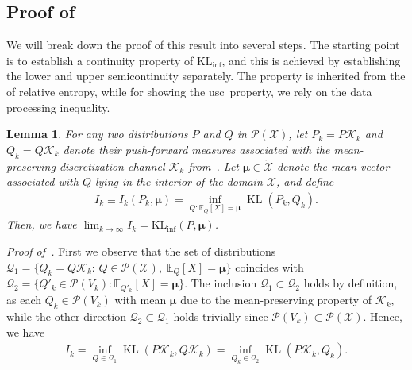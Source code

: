 \documentclass{article}
\theoremstyle{plain}
\newtheorem{lemma}[lemma]{Lemma}
\theoremstyle{definition}
\newcommand{\KLinf}{\operatorname{KL_{inf}}}
\newcommand{\KL}{\operatorname{KL}}
\newcommand{\calP}{\mathcal P}
\newcommand{\calQ}{\mathcal Q}
\newcommand{\calX}{\mathcal X}
\newcommand{\calK}{\mathcal{K}}
\newcommand{\boldmu}{\boldsymbol{\mu}}
\newcommand{\lsc}{\text{lsc}\xspace}
\begin{document}
\subsection{Proof of~}
\label{proof:continuous-klinf}
We will break down the proof of this result into several steps. The starting point is to establish a continuity property of $\KLinf$, and this is achieved by establishing the lower and upper semicontinuity separately. The \lsc property is inherited from the \lsc of relative entropy, while for showing the usc\ property, we rely on the data processing inequality.    
\begin{lemma}
    \label{lemma:interchange-1}
    For any two distributions $P$ and $Q$  in $\calP(\calX)$, let $P_k = P \calK_k $ and $Q_k = Q \calK_k$ denote their push-forward measures associated with the mean-preserving discretization channel $\calK_k$ from~. Let $\boldmu \in \mathring{\calX}$ denote the mean vector associated with $Q$ lying in the interior of the domain $\calX$, and define 
    \begin{align}
        I_k \equiv I_k(P_k, \boldmu) = \inf_{Q: \mathbb{E}_Q[X]=\boldmu} \KL(P_k, Q_k). 
    \end{align}
    Then, we have $\lim_{k \to \infty} I_k = \KLinf(P, \boldmu)$. 
\end{lemma} 


\emph{Proof of~.} 
First we observe that the set of distributions $\calQ_1 = \{Q_k = Q \calK_k: \, Q \in \calP(\calX), \; \mathbb{E}_Q[X]=\boldmu\}$ coincides with $\calQ_2 = \{Q'_k \in \calP(V_k): \mathbb{E}_{Q'_k}[X]=\boldmu\}$. The inclusion $\calQ_1 \subset \calQ_2$ holds by definition, as each $Q_k \in \calP(V_k)$ with mean $\boldmu$ due to the mean-preserving property of $\calK_k$, while the other direction $\calQ_2 \subset \calQ_1$ holds trivially since $\calP(V_k) \subset \calP(\calX)$.  Hence, we have 
\begin{align}
    I_k = \inf_{Q \in \calQ_1} \KL(P \calK_k, Q \calK_k) = \inf_{Q_k \in \calQ_2} \KL(P \calK_k, Q_k). 
\end{align}
\end{document}
